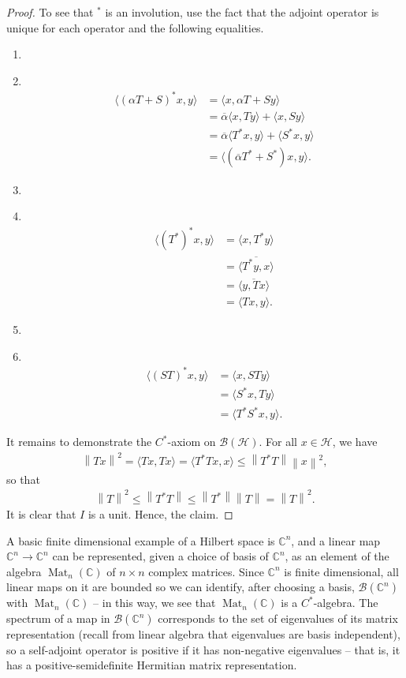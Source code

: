 \documentclass[11pt,a4paper]{report}
\theoremstyle{plain}
\theoremstyle{definition}
\newcommand{\1}{\mathbbm{1}}
\newcommand{\C}{\mathbb{C}}
\renewcommand{\H}{\mathcal{H}}
\newcommand{\B}{\mathcal{B}}
\newcommand{\BH}{\mathcal{\B(\H)}}
\newcommand\Item[1][]{ 						%
  \ifx\relax#1\relax  \item \else \item[#1] \fi
  \abovedisplayskip=0pt\abovedisplayshortskip=0pt~\vspace*{-\baselineskip}}
\DeclareMathOperator{\Mat}{\operatorname{Mat}}
\begin{document}
\begin{proof}
	To see that $^\ast$ is an involution, use the fact that the adjoint 
	operator is unique for each operator and the following equalities.
	\begin{enumerate}
	\Item	\begin{align*}
				\langle (\alpha T+S)^\ast x,y\rangle 
			&=	\langle x, \alpha T+S y \rangle												\\
			&=	\overline{\alpha}\langle x,Ty\rangle + \langle x, Sy \rangle				\\
			&=	\overline{\alpha}\langle T^\ast x,y\rangle +
										 \langle S^\ast x, y \rangle						\\
			&=	\langle(\overline{\alpha} T^\ast + S^\ast) x, y \rangle.
			\end{align*}
	\Item 	\begin{align*}
				\langle (T^\ast)^\ast x,y\rangle 
			&=	\langle x, T^\ast y \rangle													\\
			&=	\overline{\langle T^\ast y,x \rangle}										\\
			&=	\overline{\langle y, Tx \rangle}											\\
			&=	\langle Tx,y\rangle.
			\end{align*}
	\Item	\begin{align*}
				\langle (ST)^\ast x,y \rangle
			&=	\langle x, STy \rangle														\\
			&=	\langle	S^\ast x,Ty \rangle													\\
			&=	\langle T^\ast S^\ast x,y \rangle.
		\end{align*}
	\end{enumerate}
	It remains to demonstrate the $C^\ast$-axiom on $\BH$. For all $x\in\H$, we have
	\begin{align*}
		\left\|Tx\right\|^2 = \langle Tx,Tx\rangle 
							=  \langle T^\ast Tx,x\rangle 
							\leq \left\|T^\ast T\right\| \left\|x\right\|^2,
	\end{align*}
	so that
	\begin{align*}
		\left\|T\right\|^2 	\leq \left\|T^\ast T\right\| 
							\leq \left\|T^\ast\right\| \left\|T\right\| 
							= \left\|T\right\|^2.
	\end{align*}
	It is clear that $I$ is a unit.
	Hence, the claim.
\end{proof} 

A basic finite dimensional example of a Hilbert space is $\C^n$, and a linear 
map $\C^n\to\C^n$ can be represented, given a choice of basis of $\C^n$, as an 
element of the algebra $\Mat_n(\C)$ of $n\times n$ complex matrices. Since 
$\C^n$ is finite dimensional, all linear maps on it are bounded so we can 
identify, after choosing a basis, $\B(\C^n)$ with $\Mat_n(\C)$ -- in this way, 
we see that $\Mat_n(\C)$ is a $C^\ast$-algebra.
The spectrum of a map in $\B(\C^n)$ corresponds to the set of eigenvalues of 
its matrix representation (recall from linear algebra that eigenvalues are 
basis independent), so a self-adjoint operator is positive if it has 
non-negative eigenvalues -- that is, it has a positive-semidefinite Hermitian
matrix representation.
\end{document}
